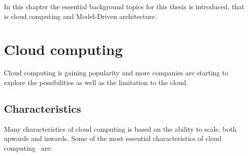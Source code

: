 


In this chapter the essential background topics for this thesis is introduced,
that is cloud computing and Model-Driven architecture.

\section{Cloud computing}

Cloud computing is gaining popularity and more companies are starting 
to explore the possibilities as well as the limitation to the cloud.

\subsection{Characteristics}
Many characteristics of cloud computing is based on the ability to scale, both upwards and inwards.
Some of the most essential characteristics of cloud computing~\cite{nist:mell11} are:
